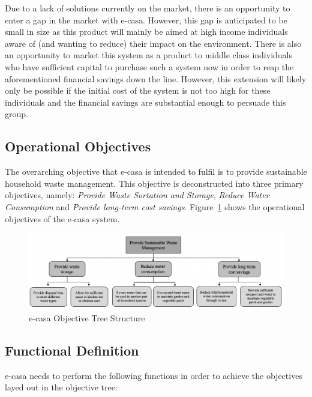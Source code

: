 \documentclass[a4paper,11pt,fleqn]{report}
\begin{document}
Due to a lack of solutions currently on the market, there is an opportunity to enter a gap in the market with \ac{e-casa}. However, this gap is anticipated to be small in size as this product will mainly be aimed at high income individuals aware of (and wanting to reduce) their impact on the environment. There is also an opportunity to market this system as a product to middle class individuals who have sufficient capital to purchase such a system now in order to reap the aforementioned financial savings down the line. However, this extension will likely only be possible if the initial cost of the system is not too high for these individuals and the financial savings are substantial enough to persuade this group.\\


\subsection{Operational Objectives}
The overarching objective that \ac{e-casa} is intended to fulfil is to provide sustainable household waste management. This objective is deconstructed into three primary objectives, namely: \textit{Provide Waste Sortation and Storage}, \textit{Reduce Water Consumption} and \textit{Provide long-term cost savings}. Figure~\ref{fig: ecasaOT} shows the operational objectives of the \ac{e-casa} system.\\

\begin{figure}[h!]
\begin{center}
\includegraphics[scale = 0.5]{ecasa_OT.png}
\caption{e-casa Objective Tree Structure}
\label{fig: ecasaOT}
\end{center}
\end{figure}

\subsection{Functional Definition}
\ac{e-casa} needs to perform the following functions in order to achieve the objectives layed out in the objective tree:\\
\end{document}
